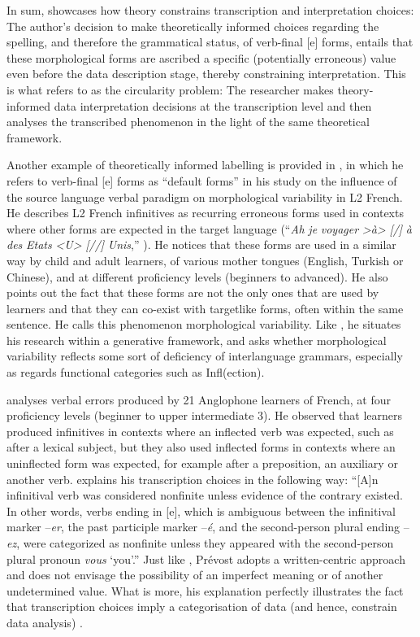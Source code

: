 \documentclass[output=paper,colorlinks,citecolor=brown,modfonts,nonflat]{../langscibook}
\begin{document}
In sum, \citet{Herschensohn2001} showcases how theory constrains transcription and interpretation choices: The author’s decision to make theoretically informed choices regarding the spelling, and therefore the grammatical status, of verb-final [e] forms, entails that these morphological forms are ascribed a specific (potentially erroneous) value even before the data description stage, thereby constraining interpretation. This is what \citet[2]{Mondada2000} refers to as the circularity problem: The researcher makes theory-informed data interpretation decisions at the transcription level and then analyses the transcribed phenomenon in the light of the same theoretical framework.

Another example of theoretically informed labelling is provided in \citet{Prévost2007French}, in which he refers to verb-final [e] forms as “default forms” in his study on the influence of the source language verbal paradigm on morphological variability in L2 French. He describes L2 French infinitives as recurring erroneous forms used in contexts where other forms are expected in the target language (“\textit{Ah} \textit{je} \textit{voyager} \textit{>à>} \textit{[/]} \textit{à} \textit{des} \textit{Etats} \textit{<U>} \textit{[//]} \textit{Unis},” \citealt[50]{Prévost2007French}). He notices that these forms are used in a similar way by child and adult learners, of various mother tongues (English, Turkish or Chinese), and at different proficiency levels (beginners to advanced). He also points out the fact that these forms are not the only ones that are used by learners and that they can co-exist with targetlike forms, often within the same sentence. He calls this phenomenon morphological variability. Like \citet{Herschensohn2001}, he situates his research within a generative framework, and asks whether morphological variability reflects some sort of deficiency of interlanguage grammars, especially as regards functional categories such as Infl(ection). 

\citet{Prévost2007English} analyses verbal errors produced by 21 Anglophone learners of French, at four proficiency levels (beginner to upper intermediate 3). He observed that learners produced infinitives in contexts where an inflected verb was expected, such as after a lexical subject, but they also used inflected forms in contexts where an uninflected form was expected, for example after a preposition, an auxiliary or another verb. \citet[360]{Prévost2007English} explains his transcription choices in the following way: “[A]n infinitival verb was considered nonfinite unless evidence of the contrary existed. In other words, verbs ending in [e], which is ambiguous between the infinitival marker –\textit{er}, the past participle marker –\textit{é}, and the second-person plural ending –\textit{ez}, were categorized as nonfinite unless they appeared with the second-person plural pronoun \textit{vous} ‘you’.” Just like \citet{Herschensohn2001}, Prévost adopts a written-centric approach and does not envisage the possibility of an imperfect meaning or of another undetermined value. What is more, his explanation perfectly illustrates the fact that transcription choices imply a categorisation of data (and hence, constrain data analysis) \citep{Mondada2007}.
\end{document}
